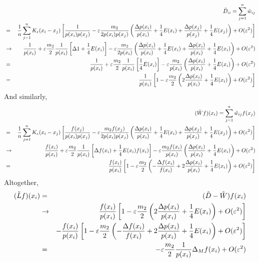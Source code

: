 \begin{eqnarray*}
&& \tilde{D}_{ii} = \sum_{j=1}^n \tilde{w}_{ij}  \\
&=& \frac{1}{n} \sum_{j=1}^n K_{\varepsilon}(x_i-x_j)\left[\frac{1}{p(x_i)p(x_j)} - \varepsilon\frac{m_2}{2p(x_i)p(x_j)}\left(\frac{\Delta p(x_i)}{p(x_i)} + \frac{1}{4}E(x_i) + \frac{\Delta p(x_j)}{p(x_j)} + \frac{1}{4}E(x_j)\right) + O(\varepsilon^2) \right] \\
&\to& \frac{1}{p(x_i)} + \varepsilon \frac{m_2}{2} \frac{1}{p(x_i)}\left[\Delta 1 + \frac{1}{4}E(x_i) \right] - \varepsilon\frac{m_2}{2p(x_i)}\left(\frac{\Delta p(x_i)}{p(x_i)} + \frac{1}{4}E(x_i) + \frac{\Delta p(x_i)}{p(x_i)} + \frac{1}{4}E(x_i)\right) + O(\varepsilon^2) \\
&=& \frac{1}{p(x_i)} + \varepsilon \frac{m_2}{2} \frac{1}{p(x_i)}\left[\frac{1}{4}E(x_i) \right] - \varepsilon\frac{m_2}{p(x_i)}\left(\frac{\Delta p(x_i)}{p(x_i)} + \frac{1}{4}E(x_i) \right) + O(\varepsilon^2) \\
&=& \frac{1}{p(x_i)}\left[1 - \varepsilon\frac{m_2}{2}\left(2\frac{\Delta p(x_i)}{p(x_i)} +\frac{1}{4}E(x_i)\right) + O(\varepsilon^2) \right]
\end{eqnarray*}
And similarly,
\begin{eqnarray*}
&& (\tilde{W}f)(x_i) = \sum_{j=1}^n \tilde{w}_{ij}f(x_j) \\
&=& \frac{1}{n} \sum_{j=1}^n K_{\varepsilon}(x_i-x_j)\left[\frac{f(x_j)}{p(x_i)p(x_j)} - \varepsilon\frac{m_2 f(x_j)}{2p(x_i)p(x_j)}\left(\frac{\Delta p(x_i)}{p(x_i)} + \frac{1}{4}E(x_i) + \frac{\Delta p(x_j)}{p(x_j)} + \frac{1}{4}E(x_j)\right) + O(\varepsilon^2) \right] \\
&\to& \frac{f(x_i)}{p(x_i)} + \varepsilon \frac{m_2}{2} \frac{1}{p(x_i)}\left[\Delta f(x_i)+\frac{1}{4}E(x_i)f(x_i) \right] - \varepsilon\frac{m_2f(x_i)}{p(x_i)}\left(\frac{\Delta p(x_i)}{p(x_i)} + \frac{1}{4}E(x_i) \right) + O(\varepsilon^2) \\
&=& \frac{f(x_i)}{p(x_i)}\left[1 - \varepsilon\frac{m_2}{2}\left(-\frac{\Delta f(x_i)}{f(x_i)} + 2\frac{\Delta p(x_i)}{p(x_i)} +\frac{1}{4}E(x_i)\right) + O(\varepsilon^2) \right]
\end{eqnarray*}
Altogether,
\begin{eqnarray*}
(\tilde{L}f)(x_i) &=& (\tilde{D}-\tilde{W})f(x_i) \\
&\to& \frac{f(x_i)}{p(x_i)}\left[1 - \varepsilon\frac{m_2}{2}\left(2\frac{\Delta p(x_i)}{p(x_i)} +\frac{1}{4}E(x_i)\right) + O(\varepsilon^2) \right] \\
&& -\frac{f(x_i)}{p(x_i)}\left[1 - \varepsilon\frac{m_2}{2}\left(-\frac{\Delta f(x_i)}{f(x_i)} + 2\frac{\Delta p(x_i)}{p(x_i)} +\frac{1}{4}E(x_i)\right) + O(\varepsilon^2) \right] \\
&=& -\varepsilon \frac{m_2}{2}\frac{1}{p(x_i)}\Delta_M f(x_i) + O(\varepsilon^2)
\end{eqnarray*}
